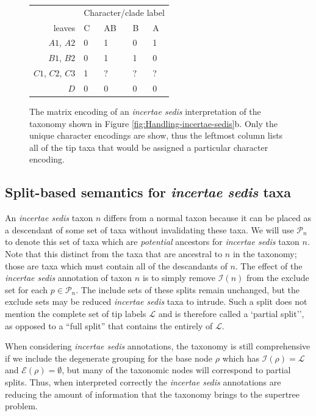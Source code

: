 \documentclass[english]{article}
\begin{document}
\begin{figure}
\begin{center}
\begin{tabular}{|r|p{2em}|p{2em}|p{2em}|p{2em}|}
\hline
& \multicolumn{4}{|c|}{Character/clade label} \\
leaves & C & AB & B & A \\
\hline
$A1$, $A2$ & 0 & 1 & 0 & 1 \\
$B1$, $B2$ & 0 & 1 & 1 & 0 \\
$C1$, $C2$, $C3$ & 1 & ? & ? & ?  \\
$D$  & 0 & 0 & 0 & 0 \\
\hline
\end{tabular}
\end{center}
\caption{\label{fig:Handling-incertae-sedis-mrp} The matrix encoding 
of an \emph{incertae sedis} interpretation of the taxonomy shown in  Figure \ref{fig:Handling-incertae-sedis}b.
Only the unique character encodings are show, thus the leftmost column
lists all of the tip taxa that would be assigned a particular character encoding.
}

\end{figure}


\subsection{Split-based semantics for \emph{incertae sedis} taxa}

An \emph{incertae sedis} taxon $n$ differs from a normal taxon because it can be
placed as a descendant of some set of taxa without invalidating these taxa.
We will use $\mathcal{P}_n$ to denote this set of taxa which are {\emph{potential}} 
ancestors for \emph{incertae sedis} taxon $n$.
Note that this distinct from the taxa that are ancestral to $n$ in the taxonomy;
    those are taxa which must contain all of the descandants of $n$.
The effect of the \emph{incertae sedis} annotation of taxon $n$ is
    to simply remove $\mathcal{I}(n)$ from the exclude set for each $p\in\mathcal{P}_n$.
The include sets of these splits remain unchanged, but the exclude sets may be reduced
\emph{incertae sedis} taxa to intrude.
Such a split does
not mention the complete set of tip labels $\mathcal{L}$ and is therefore called a
`partial split'', as opposed to a ``full split'' that contains the entirely of $\mathcal{L}$.

When considering \emph{incertae sedis} annotations, the taxonomy is still comprehensive 
if we include the degenerate grouping for the base
    node $\rho$ which has $\mathcal{I}(\rho) = \mathcal{L}$ and $\mathcal{E}(\rho) = \emptyset$,
    but many of the taxonomic nodes will correspond to partial splits.
Thus, when interpreted correctly the \emph{incertae sedis} 
annotations are reducing the amount of information that the taxonomy brings to
the supertree problem.
\end{document}
